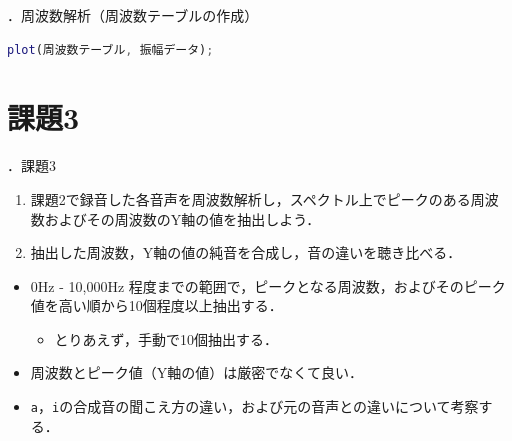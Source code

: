 \documentclass[aspectratio=43]{beamer}
\newcommand{\showsec}{\thesection ．}
\begin{document}
\begin{frame}[t,containsverbatim]{\showsec 周波数解析（周波数テーブルの作成）}
    \begin{lstlisting}[language={Matlab},frame={lines},xleftmargin={0mm}]
plot(周波数テーブル, 振幅データ);
    \end{lstlisting}
    \begin{figure}
        \centering
    \end{figure}
\end{frame}
\section{課題3}
\begin{frame}[t]{\showsec 課題3}
    \begin{exampleblock}{}
        \begin{enumerate}
            \item 課題2で録音した各音声を周波数解析し，スペクトル上でピークのある周波数およびその周波数のY軸の値を抽出しよう．
            \item 抽出した周波数，Y軸の値の純音を合成し，音の違いを聴き比べる．
        \end{enumerate}
    \end{exampleblock}
    \dotfill
    \begin{itemize}
        \item 0Hz - 10,000Hz 程度までの範囲で，ピークとなる周波数，およびそのピーク値を高い順から10個程度以上抽出する．\\
              \begin{itemize}
                  \item とりあえず，手動で10個抽出する．
              \end{itemize}
        \item 周波数とピーク値（Y軸の値）は厳密でなくて良い．
        \item \texttt{a}，\texttt{i}の合成音の聞こえ方の違い，および元の音声との違いについて考察する．
    \end{itemize}
\end{frame}
\end{document}
